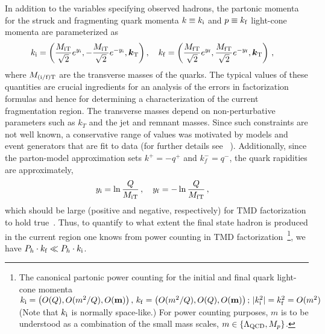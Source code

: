 \documentclass[final,3p,times,onecolumn,sort&compress,hidelinks]{elsarticle}
\newcommand{\Tsc}[2]{#1_{#2\text{T}}}
\newcommand{\initq}{\ensuremath{k_{\rm i}}}
\newcommand{\finalq}{\ensuremath{k_{\rm f}}}
\newcommand{\inity}{\ensuremath{y_{\rm i}}}
\newcommand{\finaly}{\ensuremath{y_{\rm f}}}
\newcommand{\T}[2]{\boldsymbol{#1}_{#2\text{T}}}
\newcommand{\parz}[1]{\ensuremath{\left(#1\right)}}
\newcommand\3[1]{\boldsymbol{#1}}
\begin{document}
{In addition to the variables specifying observed hadrons, the partonic momenta
for the struck and fragmenting quark 
momenta  $k\equiv\initq$ and $p\equiv\finalq$
 light-cone  momenta are parameterized as
\begin{align}
\initq &{}=\parz{\frac{\Tsc{M}{\rm i}}{\sqrt{2}} e^{\inity},-\frac{\Tsc{M}{\rm i}}{\sqrt{2}} e^{-\inity},\T{k}{}}, \quad
\finalq {}= \parz{\frac{\Tsc{M}{\rm f}}{\sqrt{2}} e^{\finaly}, \frac{\Tsc{M}{\rm f}}{\sqrt{2}} e^{-\finaly},\T{k}{}} \, ,
\label{eq:yquarkb}
\end{align}
where $\Tsc{M}{\rm (i/f)}$ are the transverse masses of the quarks.
The typical values of these quantities are crucial ingredients for an
analysis of the errors in factorization formulas and hence for
determining a characterization of the current fragmentation region.
The transverse masses depend on non-perturbative parameters such as
$k_T$ and the jet and remnant masses. Since such constraints are not well known,
a conservative range of values was motivated by models and event generators that are fit to data (for further details see ~\cite{Boglione:2016bph}). Additionally, since the parton-model approximation sets $k^+=-q^+$ and $k_f^-=q^-$, the quark rapidities are approximately,
\begin{align}
\inity {}&= \ln \frac{Q}{\Tsc{M}{\rm i} } \, ,  \quad
\finaly {}= - \ln \frac{Q}{\Tsc{M}{\rm f} }  \, , \label{eq:in outquark}
\end{align}
which should be large (positive and negative, respectively) for TMD
factorization to hold true~\cite{Collins:2011zzd,Boglione:2016bph}.
Thus, to quantify to what extent the final state hadron  is
produced in the current region one knows from power counting in TMD factorization~\footnote{The canonical partonic power counting for the initial and final quark light-cone momenta $\initq = \parz{O(Q),O(m^2/Q), O({\bf m})} , \,
  \finalq  = \parz{O(m^2/Q),O(Q), O({\bf m}) };\, 
|\initq^2| =\finalq^2 = O(m^2)$  (Note that $\initq$ is normally space-like.)
For power counting purposes, $m$ is to be understood as a combination
of the small mass scales, $m \in \{\Lambda_{\rm QCD}, M_p \}$.},
we have $P_h \cdot \finalq \ll P_h \cdot\initq$. 




}
\end{document}
